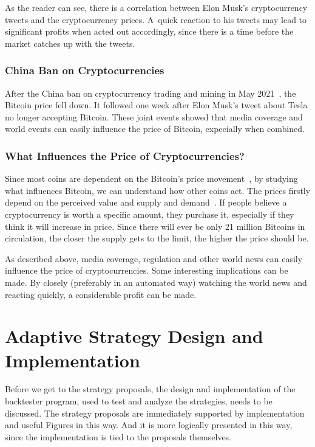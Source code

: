 As the reader can see, there is a correlation between Elon Musk's cryptocurrency tweets and the cryptocurrency prices. A~quick reaction to his tweets may lead to significant profits when acted out accordingly, since there is a time before the market catches up with the tweets.

\subsection*{China Ban on Cryptocurrencies}
After the China ban on cryptocurrency trading and mining in May 2021~\cite{china-ban-2}, the Bitcoin price fell down. It followed one week after Elon Musk's tweet about Tesla no longer accepting Bitcoin. These joint events showed that media coverage and world events can easily influence the price of Bitcoin, expecially when combined.

\subsection*{What Influences the Price of Cryptocurrencies?}
Since most coins are dependent on the Bitcoin's price movement~\cite{investopedia:altcoins}, by studying what influences Bitcoin, we can understand how other coins act. The prices firstly depend on the perceived value and supply and demand~\cite{investopedia:bitcoin-price-history}. If people believe a cryptocurrency is worth a specific amount, they purchase it, especially if they think it will increase in price. Since there will ever be only 21 million Bitcoins in circulation, the closer the supply gets to the limit, the higher the price should be.

As described above, media coverage, regulation and other world news can easily influence the price of cryptocurrencies. Some interesting implications can be made. By closely (preferably in an automated way) watching the world news and reacting quickly, a considerable profit can be made.

\chapter{Adaptive Strategy Design and Implementation}
\label{chapter-implementation}

Before we get to the strategy proposals, the design and implementation of the backtester program, used to test and analyze the strategies, needs to be discussed. The strategy proposals are immediately supported by implementation and useful Figures in this way. And it is more logically presented in this way, since the implementation is tied to the proposals themselves.


